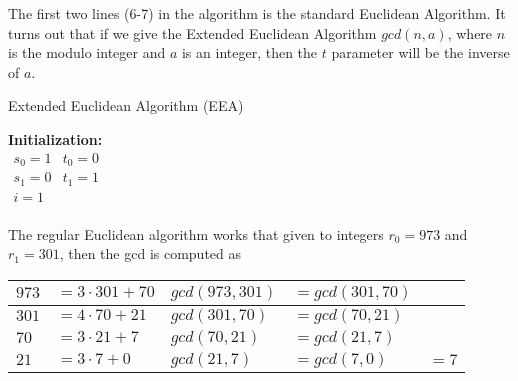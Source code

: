  The first two lines (6-7) in the algorithm is the standard Euclidean Algorithm. It turns out that if we give the Extended Euclidean Algorithm $gcd(n,a)$, where $n$ is the modulo integer and $a$ is an integer, then the $t$ parameter will be the inverse of $a$. 

\begin{center}
\begin{algorithm}[H]
\caption{Extended Euclidean Algorithm (EEA)\label{alg}}



\textbf{Initialization:} \\
$
\begin{array}{ll}
    s_0 = 1   & t_0 = 0 \\
    s_1 = 0   & t_1 = 1 \\
      i = 1     &           \\
\end{array}                 
$

\end{algorithm}
\end{center}



 The regular Euclidean algorithm works that given to integers $r_0 = 973$ and $r_1 = 301$, then the gcd is computed as 

\begin{center}
\begin{tabular}{|ll|lll| } 
\hline
$973$ & $= 3 \cdot 301 +70$& $gcd(973,301)$ & $= gcd(301,70)$ & \\ 
\hline
$301$ & $= 4 \cdot 70+21$ & $gcd(301,70)$ & $= gcd(70,21)$ &\\ 
\hline
$70$ & $= 3 \cdot 21+7$ & $gcd(70,21)$ & $= gcd(21,7)$ & \\ 
\hline
$21$ & $= 3 \cdot 7+0$ & $gcd(21,7)$ & $= gcd(7,0)$ & $= 7$ \\ 
\hline
\end{tabular}
\end{center}

